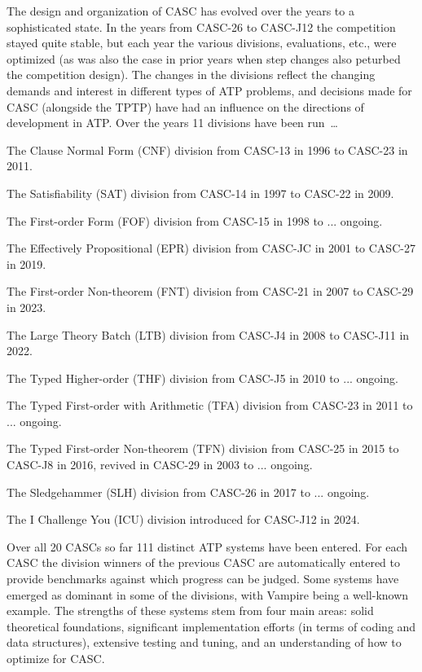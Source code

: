 \documentclass{easychair}
\newenvironment{packed_itemize}{
\vspace*{-0.2em}
\begin{itemize}
\setlength{\partopsep}{0pt}
\setlength{\itemsep}{1pt}
\setlength{\parskip}{0pt}
\setlength{\parsep}{0pt}
}{\end{itemize}}
\begin{document}
The design and organization of CASC has evolved over the years to a sophisticated state.
In the years from CASC-26 to CASC-J12 the competition stayed quite stable, but each year
the various divisions, evaluations, etc., were optimized (as was also the case in prior years
when step changes also peturbed the competition design).
The changes in the divisions reflect the changing demands and interest in different types
of ATP problems, and decisions made for CASC (alongside the TPTP) have had an influence on 
the directions of development in ATP.
Over the years 11 divisions have been run~\ldots
\begin{packed_itemize}
\item The Clause Normal Form (CNF) division from CASC-13 in 1996 to CASC-23 in 2011.
\item The Satisfiability (SAT) division from CASC-14 in 1997 to CASC-22 in 2009.
\item The First-order Form (FOF) division from CASC-15 in 1998 to ... ongoing.
\item The Effectively Propositional (EPR) division from CASC-JC in 2001 to CASC-27 in 2019.
\item The First-order Non-theorem (FNT) division from CASC-21 in 2007 to CASC-29 in 2023.
\item The Large Theory Batch (LTB) division from CASC-J4 in 2008 to CASC-J11 in 2022.
\item The Typed Higher-order (THF) division from CASC-J5 in 2010 to ... ongoing.
\item The Typed First-order with Arithmetic (TFA) division from CASC-23 in 2011 to ... ongoing.
\item The Typed First-order Non-theorem (TFN) division from CASC-25 in 2015 to CASC-J8 in 2016,
      revived in CASC-29 in 2003 to ... ongoing.
\item The Sledgehammer (SLH) division from CASC-26 in 2017 to ... ongoing.
\item The I Challenge You (ICU) division introduced for CASC-J12 in 2024.
\end{packed_itemize}

Over all 20 CASCs so far 111 distinct ATP systems have been entered.  
For each CASC the division winners of the previous CASC are automatically entered to provide 
benchmarks against which progress can be judged.
Some systems have emerged as dominant in some of the divisions, with Vampire being a well-known
example.
The strengths of these systems stem from four main areas:
solid theoretical foundations, significant implementation efforts (in terms of coding and data 
structures), extensive testing and tuning, and an understanding of how to optimize for CASC.
\end{document}
